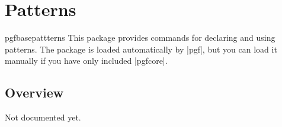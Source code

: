 %


\section{Patterns}

\label{section-patterns}

\begin{package}{pgfbasepattterns}
  This package provides commands for declaring and using patterns. The
  package is loaded automatically by 
  |pgf|, but you can load it manually if you have only included
  |pgfcore|.   
\end{package}



\subsection{Overview}

Not documented yet.





